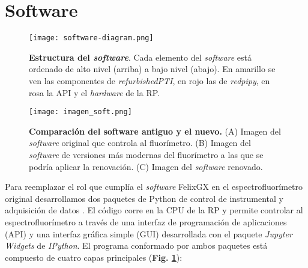 
\renewcommand{\tablename}{\textbf{Tabla}}

\section{Software} \label{sec:software}

\begin{figure}[t]
     \centering
     \texttt{[image: software-diagram.png]}
     \caption{\textbf{Estructura del \textit{software}}. Cada elemento del \textit{software} está ordenado de alto nivel (arriba) a bajo nivel (abajo). En amarillo se ven las componentes de \textit{refurbishedPTI}, en rojo las de \textit{redpipy}, en rosa la API y el \textit{hardware} de la RP.}
     \label{fig:code}
\end{figure}

\begin{figure}
    \centering
    \texttt{[image: imagen\_soft.png]}
    \caption{\textbf{Comparación del software antiguo y el nuevo.} (A) Imagen del \textit{software} original que controla al fluorímetro. (B) Imagen del \textit{software} de versiones más modernas del fluorímetro a las que se podría aplicar la renovación. (C) Imagen del \textit{software} renovado.}
    \label{fig:imagen_soft}
\end{figure}

Para reemplazar el rol que cumplía el \textit{software} FelixGX en el espectrofluorímetro original desarrollamos dos paquetes de Python de control de instrumental y adquisición de datos \cite{napoli_tdinapoli_2024,grecco_hgrecco_2024}.
El código corre en la CPU de la RP y permite controlar al espectrofluorímetro a través de una interfaz de programación de aplicaciones (API) y una interfaz gráfica simple (GUI) desarrollada con el paquete \textit{Jupyter Widgets} de \textit{IPython}.
El programa conformado por ambos paquetes está compuesto de cuatro capas principales (\textbf{Fig. \ref{fig:code}}):

